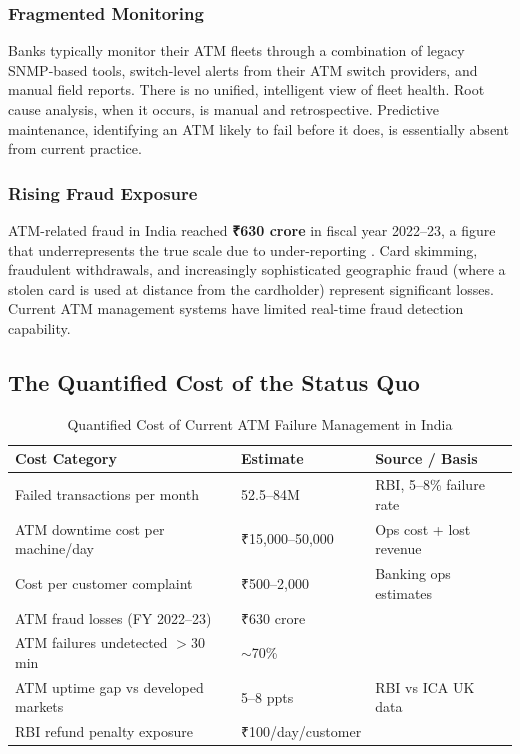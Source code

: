 \documentclass[12pt,a4paper]{article}
\newcommand{\inr}{₹}
\begin{document}
\subsubsection{Fragmented Monitoring}

Banks typically monitor their ATM fleets through a combination of legacy SNMP-based tools,
switch-level alerts from their ATM switch providers, and manual field reports. There is no
unified, intelligent view of fleet health. Root cause analysis, when it occurs, is manual and
retrospective. Predictive maintenance, identifying an ATM likely to fail before it does, is
essentially absent from current practice.

\subsubsection{Rising Fraud Exposure}

ATM-related fraud in India reached \textbf{\inr{}630 crore} in fiscal year 2022--23, a figure
that underrepresents the true scale due to under-reporting \citep{rbi2023fraud}. Card skimming,
fraudulent withdrawals, and increasingly sophisticated geographic fraud (where a stolen card is
used at distance from the cardholder) represent significant losses. Current ATM management
systems have limited real-time fraud detection capability.

\subsection{The Quantified Cost of the Status Quo}

\begin{table}[H]
\centering
\caption{Quantified Cost of Current ATM Failure Management in India}
\small
\begin{tabular}{@{}L{5.5cm} R{3cm} L{5cm}@{}}
\toprule
\textbf{Cost Category} & \textbf{Estimate} & \textbf{Source / Basis} \\
\midrule
Failed transactions per month & 52.5--84M & RBI, 5--8\% failure rate \\
ATM downtime cost per machine/day & \inr{}15,000--50,000 & Ops cost + lost revenue \\
Cost per customer complaint & \inr{}500--2,000 & Banking ops estimates \\
ATM fraud losses (FY 2022--23) & \inr{}630 crore & \citet{rbi2023fraud} \\
ATM failures undetected $>$30 min & $\sim$70\% & \citet{atia2023report} \\
ATM uptime gap vs developed markets & 5--8 ppts & RBI vs ICA UK data \\
RBI refund penalty exposure & \inr{}100/day/customer & \citet{rbi2011circular} \\
\bottomrule
\end{tabular}
\end{table}
\end{document}
